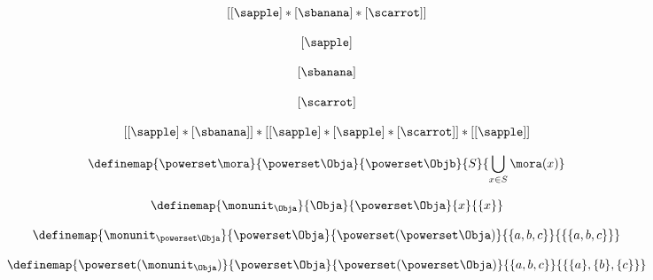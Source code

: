 {\begin{forslides}
        \begin{equation}
            \label{eq:fruit-sum-15}
            [ [ \sapple ]  *  [\sbanana]  *  [\scarrot ]  ]
        \end{equation}

        \begin{equation}
            \label{eq:fruit-sum-16}
            [ \sapple ]
        \end{equation}

        \begin{equation}
            \label{eq:fruit-sum-17}
            [ \sbanana ]
        \end{equation}

        \begin{equation}
            \label{eq:fruit-sum-18}
            [ \scarrot ]
        \end{equation}

        \begin{equation}
            \label{eq:fruit-sum-20}
            [ [ \sapple ]   * [ \sbanana] ] *  [[ \sapple ]   *  [ \sapple ] *  [\scarrot ] ]   *  [[ \sapple ] ]
        \end{equation}


    \end{forslides}

}

\begin{equation}
    \label{eq:monad-power-functor}
    \definemap{
        \powerset \mora
    }{
        \powerset \Obja
    }{
        \powerset \Objb
    }{
        S
    }{
        \bigcup_{x\in S} \mora(x)
    }
\end{equation}

\begin{equation}
    \label{eq:monad-power-monunit}
    \definemap{
        \monunit_\Obja
    }{
        \Obja
    }{
        \powerset\Obja
    }{
        x
    }{
        \{ x \}
    }
\end{equation}


\begin{equation}
    \label{eq:monad-power-monunit-power}
    \definemap{
        \monunit_{\powerset \Obja}
    }{
        \powerset \Obja
    }{
        \powerset (\powerset\Obja)
    }{
        \{a, b, c\}
    }{
        \{ \{a, b, c \} \}
    }
\end{equation}


\begin{equation}
    \label{eq:monad-power-power-monunit}
    \definemap{
        \powerset(\monunit_\Obja)
    }{
        \powerset \Obja
    }{
        \powerset (\powerset\Obja)
    }{
        \{a, b, c\}
    }{
        \{ \{a\}, \{ b\}, \{c\} \}
    }
\end{equation}



